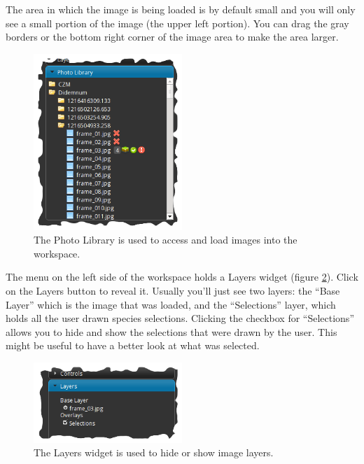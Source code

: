 \documentclass[twoside,a4paper]{refart}
\begin{document}
\attention
The area in which the image is being loaded is by default small and you will only see a small portion of the image (the upper left portion). You can drag the gray borders or the bottom right corner of the image area to make the area larger.

\begin{figure}[hbtp]
\centering
\includegraphics[width=0.5\textwidth]{screenshots/masis-photo-library}
\caption{The Photo Library is used to access and load images into the workspace.}
\label{fig:masis-photo-library}
\end{figure}

The menu on the left side of the workspace holds a Layers widget (figure \ref{fig:masis-layers}). Click on the Layers button to reveal it. Usually you'll just see two layers: the ``Base Layer'' which is the image that was loaded, and the ``Selections'' layer, which holds all the user drawn species selections. Clicking the checkbox for ``Selections'' allows you to hide and show the selections that were drawn by the user. This might be useful to have a better look at what was selected.

\begin{figure}[hbtp]
\centering
\includegraphics[width=0.5\textwidth]{screenshots/masis-layers}
\caption{The Layers widget is used to hide or show image layers.}
\label{fig:masis-layers}
\end{figure}
\end{document}
